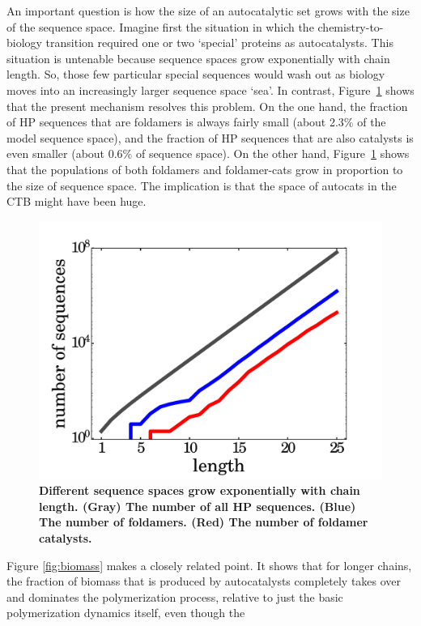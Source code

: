 \documentclass[journal=jacsat,manuscript=article,layout=twocolumn]{achemso}
\begin{document}
 An important question is how the size of an autocatalytic set grows with the size of the sequence 
space.  Imagine first the situation in which the chemistry-to-biology transition required one or 
two `special' proteins as autocatalysts.  This situation is untenable because sequence spaces grow 
exponentially with chain length.  So, those few particular special sequences would wash out as 
biology moves into an increasingly larger sequence space `sea'.  In contrast, 
Figure~\ref{fig:hp-statistics} shows that the present mechanism resolves this problem.  On the one 
hand, the fraction of HP sequences that are foldamers is always fairly small (about 2.3\% of the 
model sequence space), and the fraction of HP sequences that are also catalysts is even smaller 
(about 0.6\% of sequence space).  On the other hand, Figure~\ref{fig:hp-statistics} shows that the 
populations of both foldamers and foldamer-cats grow in proportion to the size of sequence space.  
The implication is that the space of autocats in the CTB might have been huge.
\begin{figure}[hbt!]
  \centering
  \includegraphics[width=0.9\columnwidth]{pictures/hp-statistics.pdf} 
  \caption{\footnotesize{\bf{Different sequence spaces grow exponentially with chain length.}  
(Gray) The number of all HP sequences.  (Blue) The number of foldamers.  (Red) The number of 
foldamer catalysts.}}
  \label{fig:hp-statistics}
\end{figure}
 Figure \ref{fig:biomass} makes a closely related point.  It shows that for longer chains, the 
fraction of biomass that is produced by autocatalysts completely takes over and dominates the 
polymerization process, relative to just the basic polymerization dynamics itself, even though the 
\end{document}
